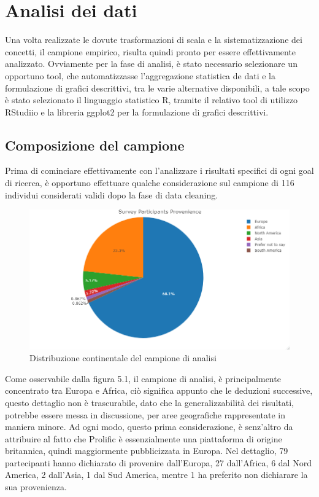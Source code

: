     \section{Analisi dei dati}
    Una volta realizzate le dovute trasformazioni di scala e la sistematizzazione dei concetti, il campione empirico, risulta quindi pronto per essere effettivamente analizzato. Ovviamente per la fase di analisi, è stato necessario selezionare un opportuno tool, che automatizzasse l'aggregazione statistica de dati e la formulazione di grafici descrittivi, tra le varie alternative disponibili, a tale scopo è stato selezionato il linguaggio statistico R, tramite il relativo tool di utilizzo RStudiio e la libreria ggplot2 per la formulazione di grafici descrittivi.
    
    \subsection{Composizione del campione}
    
    Prima di cominciare effettivamente con l'analizzare i risultati specifici di ogni goal di ricerca, è opportuno effettuare qualche considerazione sul campione di 116 individui considerati validi dopo la fase di data cleaning. \\

    
    \begin{figure}[h]
        \centering
        \includegraphics[width=1\textwidth]{figure/Analisi/Background/Survey_Partecipants_Provenience.png}
        \caption{Distribuzione continentale del campione di analisi}
    \end{figure}
    
    Come osservabile dalla figura 5.1, il campione di analisi, è principalmente concentrato tra Europa e Africa, ciò significa appunto che le deduzioni successive, questo dettaglio non è trascurabile, dato che la generalizzabilità dei risultati, potrebbe essere messa in discussione, per aree geografiche rappresentate in maniera minore. Ad ogni modo, questo prima considerazione, è senz'altro da attribuire al fatto che Prolific è essenzialmente una piattaforma di origine britannica, quindi maggiormente pubblicizzata in Europa. Nel dettaglio, 79 partecipanti hanno dichiarato di provenire dall'Europa, 27 dall'Africa, 6 dal Nord America, 2 dall'Asia, 1 dal Sud America, mentre 1 ha preferito non dichiarare la sua provenienza.
    
